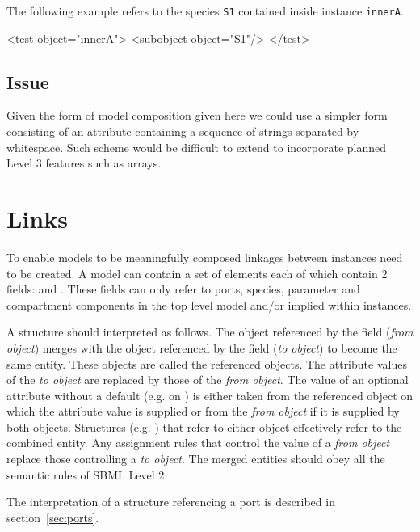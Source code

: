 \documentclass{cekarticle}
\begin{document}
The following example refers to the species \texttt{S1} contained inside instance \texttt{innerA}.

\begin{example}
<test object="innerA">
    <subobject object="S1"/>
</test>
\end{example}

\subsection{Issue}

Given the form of model composition given here we could use a simpler form consisting of an attribute containing a
sequence of  strings separated by whitespace. Such scheme would be difficult to extend to incorporate planned
Level 3 features such as arrays.

\section{Links}
\label{sec:links}

To enable models to be meaningfully composed linkages between instances need to be
created.  A model can contain a set of  elements each of which contain 2
fields:  and .
These fields can only refer to ports, species, parameter and compartment components
in the top level model and/or 
implied within instances.

A  structure should interpreted as follows.  The object referenced by the
 field (\emph{from object})
merges with the object referenced by the  field (\emph{to object}) to
become the same entity.  These objects are called the referenced objects. 
The attribute values 
of the \emph{to object}
are replaced by those of the \emph{from object}.  The value of an optional attribute without a default
 (e.g.  on
) is either taken from the referenced object on which the attribute value is
supplied or from the \emph{from object} if it is supplied
by both objects.  Structures (e.g. ) that refer to either
object effectively refer to the combined entity.
Any assignment rules that control the value of a \emph{from object} replace those
controlling a \emph{to object}.  The merged entities should obey all the semantic rules
of SBML Level 2.

The interpretation of a  structure referencing a port is described 
in section~\ref{sec:ports}.
\end{document}

